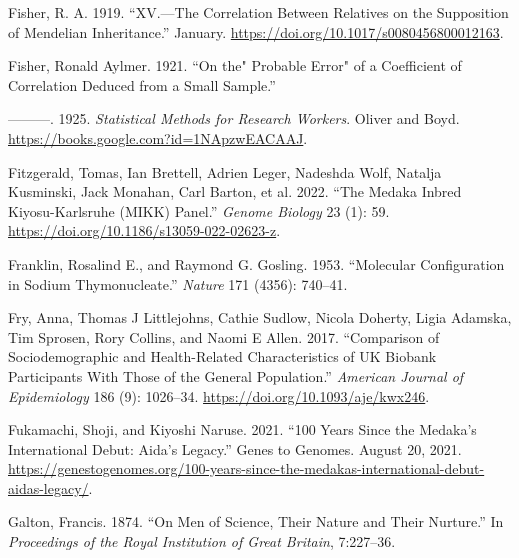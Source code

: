 \documentclass[
]{book}
\newlength{\cslhangindent}
\newlength{\cslentryspacingunit} %
\newenvironment{CSLReferences}[2] %
 {%
  \setlength{\parindent}{0pt}
  \ifodd #1
  \let\oldpar\par
  \def\par{\hangindent=\cslhangindent\oldpar}
  \fi
  \setlength{\parskip}{#2\cslentryspacingunit}
 }%
 {}
\begin{document}
\begin{CSLReferences}{1}{0}
\leavevmode{}%
Fisher, R. A. 1919. {``{XV}.---{The Correlation} Between {Relatives} on the {Supposition} of {Mendelian Inheritance}.''} January. \url{https://doi.org/10.1017/s0080456800012163}.

\leavevmode{}%
Fisher, Ronald Aylmer. 1921. {``On the{"} {Probable Error}{"} of a {Coefficient} of {Correlation Deduced} from a {Small Sample}.''}

\leavevmode{}%
---------. 1925. \emph{Statistical {Methods} for {Research Workers}}. {Oliver and Boyd}. \url{https://books.google.com?id=1NApzwEACAAJ}.

\leavevmode{}%
Fitzgerald, Tomas, Ian Brettell, Adrien Leger, Nadeshda Wolf, Natalja Kusminski, Jack Monahan, Carl Barton, et al. 2022. {``The {Medaka Inbred Kiyosu-Karlsruhe} ({MIKK}) Panel.''} \emph{Genome Biology} 23 (1): 59. \url{https://doi.org/10.1186/s13059-022-02623-z}.

\leavevmode{}%
Franklin, Rosalind E., and Raymond G. Gosling. 1953. {``Molecular Configuration in Sodium Thymonucleate.''} \emph{Nature} 171 (4356): 740--41.

\leavevmode{}%
Fry, Anna, Thomas J Littlejohns, Cathie Sudlow, Nicola Doherty, Ligia Adamska, Tim Sprosen, Rory Collins, and Naomi E Allen. 2017. {``Comparison of {Sociodemographic} and {Health-Related Characteristics} of {UK Biobank Participants With Those} of the {General Population}.''} \emph{American Journal of Epidemiology} 186 (9): 1026--34. \url{https://doi.org/10.1093/aje/kwx246}.

\leavevmode{}%
Fukamachi, Shoji, and Kiyoshi Naruse. 2021. {``100 Years Since the Medaka's International Debut: {Aida}'s Legacy.''} {Genes to Genomes}. August 20, 2021. \url{https://genestogenomes.org/100-years-since-the-medakas-international-debut-aidas-legacy/}.

\leavevmode{}%
Galton, Francis. 1874. {``On {Men} of {Science}, Their {Nature} and Their {Nurture}.''} In \emph{Proceedings of the {Royal Institution} of {Great Britain}}, 7:227--36.


\end{CSLReferences}
\end{document}
